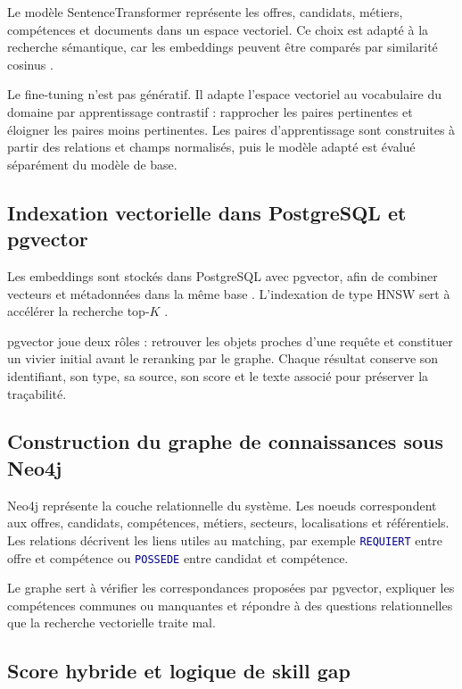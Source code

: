 \documentclass[12pt,twoside]{report}
\newcommand{\filevar}[1]{\texttt{\textcolor{darkblue}{#1}}}
\begin{document}
Le modèle SentenceTransformer représente les offres, candidats, métiers, compétences et documents dans un espace vectoriel. Ce choix est adapté à la recherche sémantique, car les embeddings peuvent être comparés par similarité cosinus \cite{reimers2019sbert}.

Le fine-tuning n'est pas génératif. Il adapte l'espace vectoriel au vocabulaire du domaine par apprentissage contrastif : rapprocher les paires pertinentes et éloigner les paires moins pertinentes. Les paires d'apprentissage sont construites à partir des relations et champs normalisés, puis le modèle adapté est évalué séparément du modèle de base.

\subsection{Indexation vectorielle dans PostgreSQL et pgvector}

Les embeddings sont stockés dans PostgreSQL avec pgvector, afin de combiner vecteurs et métadonnées dans la même base \cite{pgvector2024}. L'indexation de type HNSW sert à accélérer la recherche top-$K$ \cite{malkov2018hnsw}.

pgvector joue deux rôles : retrouver les objets proches d'une requête et constituer un vivier initial avant le reranking par le graphe. Chaque résultat conserve son identifiant, son type, sa source, son score et le texte associé pour préserver la traçabilité.

\subsection{Construction du graphe de connaissances sous Neo4j}

Neo4j représente la couche relationnelle du système. Les noeuds correspondent aux offres, candidats, compétences, métiers, secteurs, localisations et référentiels. Les relations décrivent les liens utiles au matching, par exemple \filevar{REQUIERT} entre offre et compétence ou \filevar{POSSEDE} entre candidat et compétence.

Le graphe sert à vérifier les correspondances proposées par pgvector, expliquer les compétences communes ou manquantes et répondre à des questions relationnelles que la recherche vectorielle traite mal.

\subsection{Score hybride et logique de skill gap}
\end{document}
